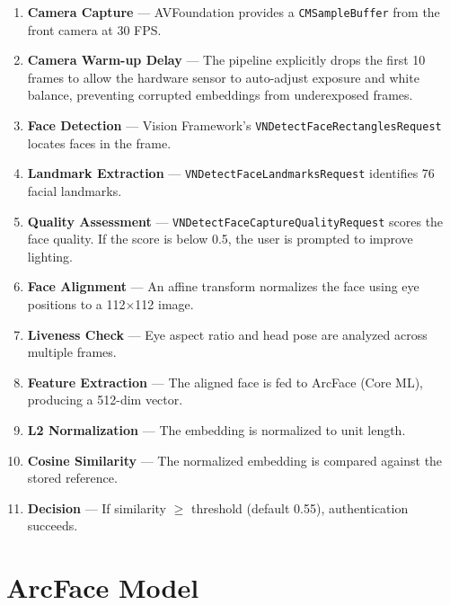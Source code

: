 \documentclass[12pt,a4paper]{report}
\begin{document}
\begin{enumerate}
    \item \textbf{Camera Capture} — AVFoundation provides a \texttt{CMSampleBuffer} from the front camera at 30 FPS.
    \item \textbf{Camera Warm-up Delay} — The pipeline explicitly drops the first 10 frames to allow the hardware sensor to auto-adjust exposure and white balance, preventing corrupted embeddings from underexposed frames.
    \item \textbf{Face Detection} — Vision Framework's \texttt{VNDetectFaceRectanglesRequest} locates faces in the frame.
    \item \textbf{Landmark Extraction} — \texttt{VNDetectFaceLandmarksRequest} identifies 76 facial landmarks.
    \item \textbf{Quality Assessment} — \texttt{VNDetectFaceCaptureQualityRequest} scores the face quality. If the score is below 0.5, the user is prompted to improve lighting.
    \item \textbf{Face Alignment} — An affine transform normalizes the face using eye positions to a 112$\times$112 image.
    \item \textbf{Liveness Check} — Eye aspect ratio and head pose are analyzed across multiple frames.
    \item \textbf{Feature Extraction} — The aligned face is fed to ArcFace (Core ML), producing a 512-dim vector.
    \item \textbf{L2 Normalization} — The embedding is normalized to unit length.
    \item \textbf{Cosine Similarity} — The normalized embedding is compared against the stored reference.
    \item \textbf{Decision} — If similarity $\geq$ threshold (default 0.55), authentication succeeds.
\end{enumerate}

\section{ArcFace Model}
\end{document}
